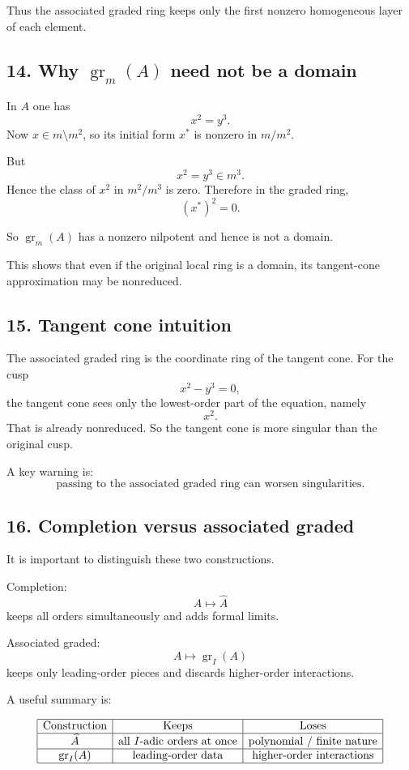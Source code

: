 \documentclass[12pt,a4paper]{article}
\theoremstyle{plain}
\theoremstyle{definition}      %
\begin{document}
	Thus the associated graded ring keeps only the first nonzero homogeneous layer of each element.
	
	\subsection*{14. Why \(\operatorname{gr}_m(A)\) need not be a domain}
	
	In \(A\) one has
	\[
	x^2=y^3.
	\]
	Now \(x\in m\setminus m^2\), so its initial form \(x^*\) is nonzero in \(m/m^2\).
	
	But
	\[
	x^2=y^3\in m^3.
	\]
	Hence the class of \(x^2\) in \(m^2/m^3\) is zero. Therefore in the graded ring,
	\[
	(x^*)^2=0.
	\]
	
	So \(\operatorname{gr}_m(A)\) has a nonzero nilpotent and hence is not a domain.
	
	This shows that even if the original local ring is a domain, its tangent-cone approximation may be nonreduced.
	
	\subsection*{15. Tangent cone intuition}
	
	The associated graded ring is the coordinate ring of the tangent cone. For the cusp
	\[
	x^2-y^3=0,
	\]
	the tangent cone sees only the lowest-order part of the equation, namely
	\[
	x^2.
	\]
	That is already nonreduced. So the tangent cone is more singular than the original cusp.
	
	A key warning is:
	\[
	\boxed{\text{passing to the associated graded ring can worsen singularities.}}
	\]
	
	\subsection*{16. Completion versus associated graded}
	
	It is important to distinguish these two constructions.
	
	Completion:
	\[
	A\mapsto \widehat A
	\]
	keeps all orders simultaneously and adds formal limits.
	
	Associated graded:
	\[
	A\mapsto \operatorname{gr}_I(A)
	\]
	keeps only leading-order pieces and discards higher-order interactions.
	
	A useful summary is:
	
	\[
	\begin{array}{|c|c|c|}
		\hline
		\text{Construction} & \text{Keeps} & \text{Loses} \\
		\hline
		\widehat A & \text{all }I\text{-adic orders at once} & \text{polynomial / finite nature} \\
		\hline
		\operatorname{gr}_I(A) & \text{leading-order data} & \text{higher-order interactions} \\
		\hline
	\end{array}
	\]
	
\end{document}
